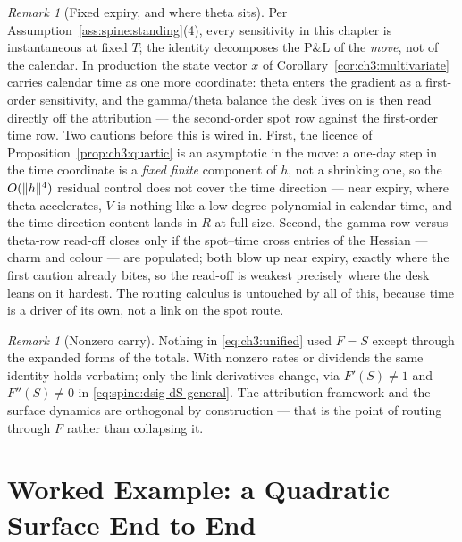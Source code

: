 \documentclass[11pt]{book}
\theoremstyle{plain}
\theoremstyle{definition}
\theoremstyle{remark}
\newtheorem{remark}[theorem]{Remark}
\DeclarePairedDelimiter{\norm}{\lVert}{\rVert}
\begin{document}
\begin{remark}[Fixed expiry, and where theta sits]\label{rem:ch3:theta}
Per Assumption~\ref{ass:spine:standing}(4), every sensitivity in this chapter
is instantaneous at fixed $T$; the identity decomposes the P\&L of the
\emph{move}, not of the calendar. In production the state vector $x$ of
Corollary~\ref{cor:ch3:multivariate} carries calendar time as one more
coordinate: theta enters the gradient as a first-order sensitivity, and the
gamma/theta balance the desk lives on is then read directly off the
attribution --- the second-order spot row against the first-order time row.
Two cautions before this is wired in. First, the licence of
Proposition~\ref{prop:ch3:quartic} is an asymptotic in the move: a one-day
step in the time coordinate is a \emph{fixed finite} component of $h$, not a
shrinking one, so the $O(\norm{h}^4)$ residual control does not cover the
time direction --- near expiry, where theta accelerates, $V$ is nothing like
a low-degree polynomial in calendar time, and the time-direction content
lands in $R$ at full size. Second, the gamma-row-versus-theta-row read-off
closes only if the spot--time cross entries of the Hessian --- charm and
colour --- are populated; both blow up near expiry, exactly where the first
caution already bites, so the read-off is weakest precisely where the desk
leans on it hardest. The routing calculus is untouched by all of this,
because time is a driver of its own, not a link on the spot route.
\end{remark}

\begin{remark}[Nonzero carry]\label{rem:ch3:carry}
Nothing in \eqref{eq:ch3:unified} used $F = S$ except through the expanded
forms of the totals. With nonzero rates or dividends the same identity holds
verbatim; only the link derivatives change, via $F'(S) \neq 1$ and
$F''(S) \neq 0$ in \eqref{eq:spine:dsig-dS-general}. The attribution
framework and the surface dynamics are orthogonal by construction --- that is
the point of routing through $F$ rather than collapsing it.
\end{remark}

\section{Worked Example: a Quadratic Surface End to End}
\label{sec:ch3:worked}
\end{document}
